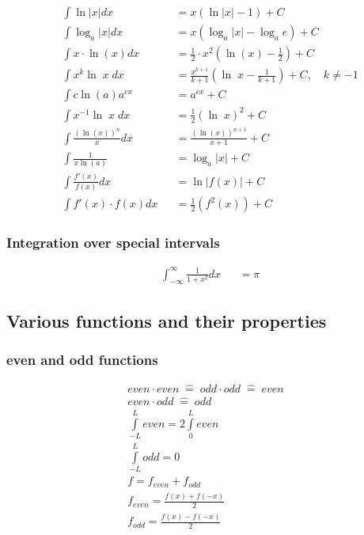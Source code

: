 \begin{footnotesize}
\begin{align*}
         & \int \ln\vert x\vert dx               &  & =x(\ln\vert x \vert -1)+C                                                         \\
         & \int \log_a\vert x \vert dx           &  & =x(\log_a\vert x\vert -\log_a e)+C                                                \\
         & \int x \cdot \ln(x) dx                &  & =\frac 1 2 \cdot x^2(\ln(x)-\frac{1}{2})+C                                        \\
         & \int x^k \ln\; x \;dx                 &  & =\frac{x^{k+1}}{k+1}\left(\ln\; x-\frac{1}{k+1}\right)+C,\quad k\neq -1           \\
         & \int c\ln(a)a^{cx}                    &  & = a^{cx} + C                                                                      \\
         & \int x^{-1}\ln\; x \; dx              &  & =\frac{1}{2}{(\ln\; x)}^2+C                                                       \\
         & \int \frac{{(\ln(x))}^n}{x}dx         &  & =\frac{{(\ln(x))}^{n+1}}{x+1}+C                                                   \\
         & \int \frac{1}{x\ln(a)}                &  & = \log_a|x| +C                                                                    \\
         & \int \frac{f'(x)}{f(x)}dx             &  & =\ln\vert f(x) \vert +C                                                           \\
         & \int f'(x) \cdot f(x) dx              &  & = \frac{1}{2}(f^2(x))+C
    \end{align*}
\end{footnotesize}

\subsubsection{Integration over special intervals}
\begin{align*}
     & \int_{-\infty}^{\infty}\frac{1}{1+x^2}dx &  & =\pi
\end{align*}

\subsection{Various functions and their properties}
\subsubsection{even and odd functions}
\begin{gather*}
    even \cdot even\;\widehat{=}\; odd \cdot odd \;\widehat{=}\; even \\
    even \cdot odd \;\widehat{=}\; odd \\
    \int\limits_{-L}^L even=2\int\limits_0^L even \\
    \int\limits_{-L}^L odd = 0 \\
    f=f_{even}+f_{odd} \\
    f_{even}=\frac{f(x)+f(-x)}{2} \\
    f_{odd}=\frac{f(x)-f(-x)}{2}
\end{gather*}

